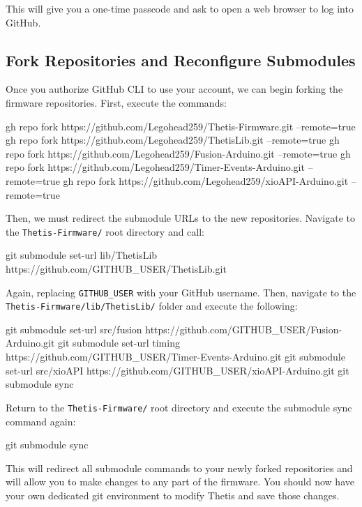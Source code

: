 This will give you a one-time passcode and ask to open a web browser to log into GitHub.

\subsection{Fork Repositories and Reconfigure Submodules}
Once you authorize GitHub CLI to use your account, we can begin forking the firmware repositories.
First, execute the commands:

\newpage
\begin{bash}
    gh repo fork https://github.com/Legohead259/Thetis-Firmware.git --remote=true
    gh repo fork https://github.com/Legohead259/ThetisLib.git --remote=true
    gh repo fork https://github.com/Legohead259/Fusion-Arduino.git --remote=true
    gh repo fork https://github.com/Legohead259/Timer-Events-Arduino.git --remote=true
    gh repo fork https://github.com/Legohead259/xioAPI-Arduino.git --remote=true
\end{bash}

Then, we must redirect the submodule URLs to the new repositories.
Navigate to the \lstinline[style=customInline]|Thetis-Firmware/| root directory and call:

\begin{bash}
    git submodule set-url lib/ThetisLib https://github.com/GITHUB_USER/ThetisLib.git
\end{bash}

Again, replacing \lstinline[style=customInline]|GITHUB_USER| with your GitHub username.
Then, navigate to the \lstinline[style=customInline]|Thetis-Firmware/lib/ThetisLib/| folder and execute the following:

\begin{bash}
    git submodule set-url src/fusion https://github.com/GITHUB_USER/Fusion-Arduino.git
    git submodule set-url timing https://github.com/GITHUB_USER/Timer-Events-Arduino.git
    git submodule set-url src/xioAPI https://github.com/GITHUB_USER/xioAPI-Arduino.git
    git submodule sync
\end{bash}

Return to the \lstinline[style=customInline]|Thetis-Firmware/| root directory and execute the submodule sync command again:

\begin{bash}
    git submodule sync
\end{bash}

This will redirect all submodule commands to your newly forked repositories and will allow you to make changes to any part of the firmware.
You should now have your own dedicated git environment to modify Thetis and save those changes.
